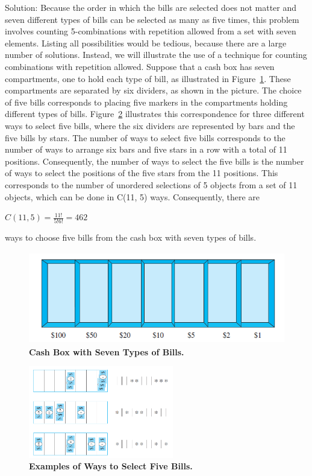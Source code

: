 \documentclass[11pt,a4paper]{book}
\begin{document}
\begin{enumerate}[label=Example~\arabic*]
Solution: Because the order in which the bills are selected does not matter and seven different types of bills can be selected as many as five times, this problem involves counting 5-combinations with repetition allowed from a set with seven elements.
Listing all possibilities would be tedious, because there are a large number of solutions.
Instead, we will illustrate the use of a technique for counting combinations with repetition allowed.
Suppose that a cash box has seven compartments, one to hold each type of bill, as illustrated in Figure~\ref{fig:bills}.
These compartments are separated by six dividers, as shown in the picture.
The choice of five bills corresponds to placing five markers in the compartments holding different types of bills.
Figure~\ref{fig:5bills} illustrates this correspondence for three different ways to select five bills, where the six dividers are represented by bars and the five bills by stars.
The number of ways to select five bills corresponds to the number of ways to arrange six bars and five stars in a row with a total of 11 positions.
Consequently, the number of ways to select the five bills is the number of ways to select the positions of the five stars from the 11 positions.
This corresponds to the number of unordered selections of 5 objects from a set of 11 objects, which can be done in C(11, 5) ways.
Consequently, there are

$C(11, 5) = \frac{11!}{5!6!} = 462$

ways to choose five bills from the cash box with seven types of bills.

\begin{figure}[h]
\centering
\includegraphics[height=4cm]{images/exemplo3-65.png}
\caption{\textbf{Cash Box with Seven Types of Bills.}}
\label{fig:bills}
\end{figure}

\begin{figure}[h]
\centering
\includegraphics[height=4cm]{images/exemplo3-652.png}
\caption{\textbf{Examples of Ways to Select Five Bills.}}
\label{fig:5bills}
\end{figure}


\end{enumerate}
\end{document}
